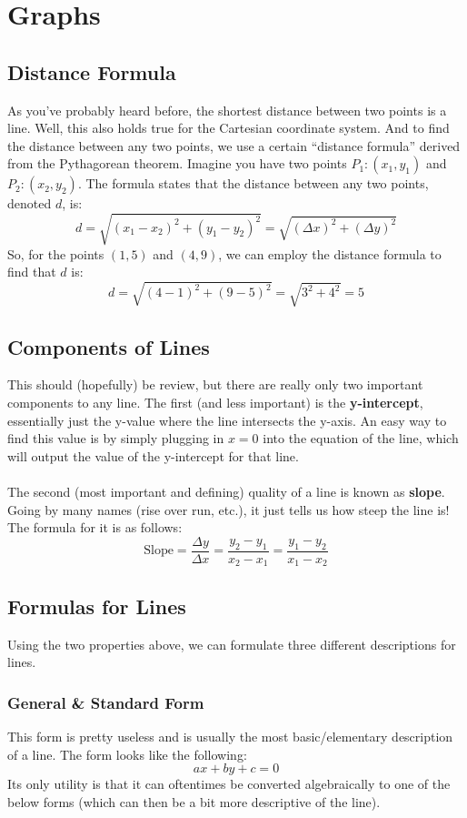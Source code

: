 \section{Graphs}
\subsection{Distance Formula}
As you've probably heard before, the shortest distance between two points is a line. Well, this also holds true for the Cartesian coordinate system. And to find the distance between any two points, we use a certain ``distance formula'' derived from the Pythagorean theorem. Imagine you have two points $P_1: (x_1,y_1)$ and $P_2: (x_2, y_2)$. The formula states that the distance between any two points, denoted $d$, is:
$$
d = \sqrt{\left(x_1 - x_2\right)^2 + \left(y_1 - y_2\right)^2} = \sqrt{\left(\Delta x\right)^2 + \left(\Delta y\right)^2}
$$
So, for the points $(1,5)$ and $(4,9)$, we can employ the distance formula to find that $d$ is:
$$
d = \sqrt{\left(4-1\right)^2 + \left(9-5\right)^2} =  \sqrt{3^2 + 4^2} = 5
$$
\subsection{Components of Lines}
This should (hopefully) be review, but there are really only two important components to any line. The first (and less important) is the \textbf{y-intercept}, essentially just the y-value where the line intersects the y-axis. An easy way to find this value is by simply plugging in $x=0$ into the equation of the line, which will output the value of the y-intercept for that line.\\
\\
The second (most important and defining) quality of a line is known as \textbf{slope}. Going by many names (rise over run, etc.), it just tells us how steep the line is! The formula for it is as follows:
$$
\text{Slope} = \frac{\Delta y}{\Delta x} = \frac{y_2 - y_1}{x_2 - x_1} = \frac{y_1 - y_2}{x_1 - x_2 }
$$
\subsection{Formulas for Lines}
Using the two properties above, we can formulate three different descriptions for lines.
\subsubsection{General \& Standard Form}
This form is pretty useless and is usually the most basic/elementary description of a line. The form looks like the following:
$$
ax + by + c = 0
$$
Its only utility is that it can oftentimes be converted algebraically to one of the below forms (which can then be a bit more descriptive of the line).
